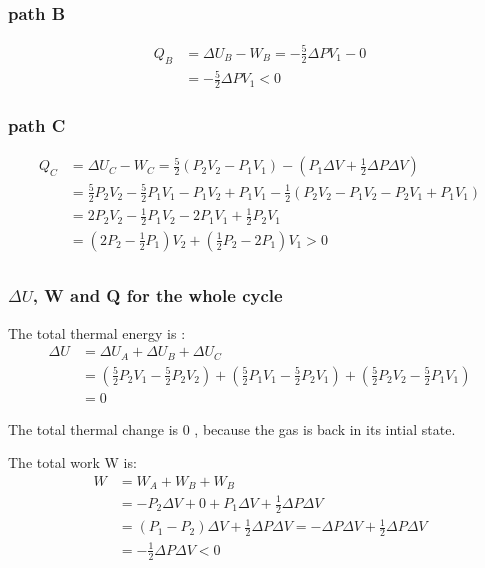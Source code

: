 \documentclass[a4paper,11pt]{article}
\begin{document}
\subsubsection{path B}
\begin{align*}
Q_B & = \Delta U_B- W_B=  -\frac{5}{2}\Delta PV_1  - 0
\\
& = -\frac{5}{2}\Delta PV_1  < 0
\end{align*}


\subsubsection{path C}

\begin{align*}
Q_C & = \Delta U_C- W_C=  \frac{5}{2} (P_2V_2 - P_1V_1 )  - (P_1 \Delta V  + \frac{1}{2} \Delta P\Delta V)
\\
& = \frac{5}{2}P_2V_2 -\frac{5}{2}P_1V_1 - P_1V_2 + P_1V_1 - \frac{1}{2}(P_2V_2 -P_1V_2 - P_2V_1+ P_1V_1)
\\
& = 2P_2V_2  -\frac{1}{2}P_1V_2 -2P_1V_1 + \frac{1}{2}P_2V_1
\\
& = (2P_2 - \frac{1}{2}P_1)V_2 + (\frac{1}{2}P_2 -2P_1)V_1    >0
\end{align*}



\subsection[1.5]{}

\subsubsection{$\Delta U$, W and Q for the whole cycle}

The total thermal energy is :
\begin{align*}
\Delta U & = \Delta U_A + \Delta U_B + \Delta U_C
\\
& = (\frac{5}{2}P_2V_1-\frac{5}{2}P_2V_2 ) + (\frac{5}{2}P_1V_1-\frac{5}{2}P_2V_1 )
+ (\frac{5}{2}P_2V_2 -\frac{5}{2}P_1V_1)
\\
& = 0
\end{align*}

The total thermal change is 0 , because the gas is back in its intial state.


The total work W is:
\begin{align*}
W & = W_A + W_B + W_B\\
& = -P_2\Delta V + 0 + P_1\Delta V  + \frac{1}{2} \Delta P\Delta V\\
& = (P_1 -P_2) \Delta V + \frac{1}{2} \Delta P\Delta V
= -\Delta P\Delta V + \frac{1}{2} \Delta P\Delta V\\
& = -\frac{1}{2}\Delta P\Delta V <0
\end{align*}
\end{document}
